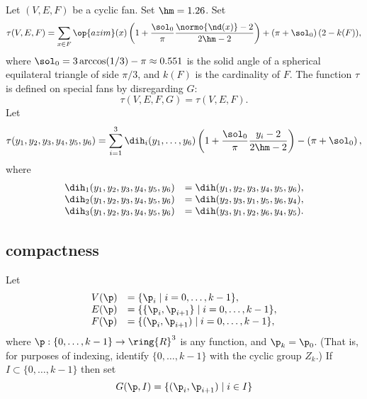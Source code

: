 \begin{definition}\label{def:tau}
Let $(V,E,F)$ be a cyclic fan.  Set $\hm = 1.26$.  Set
\begin{displaymath}
  \tau(V,E,F) =\sum_{x\in F} \op{azim}(x)\left(1 + \dfrac{\sol_0}{\pi}  
    \dfrac{\normo{\nd(x)}-2}{2\hm-2}\right) 
+ \left(\pi+{\sol_0}\right) (2- k(F)),
\end{displaymath}
where $\sol_0=3\arccos(1/3)-\pi\approx0.551$ is the solid angle of a
spherical equilateral triangle of side $\pi/3$, and $k(F)$ is the
cardinality of $F$.  The function $\tau$ is defined on special fans by
disregarding $G$:
\begin{displaymath}
\tau(V,E,F,G) = \tau(V,E,F).
\end{displaymath}
Let 
\begin{displaymath}
  \tau(y_1,y_2,y_3,y_4,y_5,y_6) =
  \sum_{i=1}^3 \dih_i(y_1,\ldots,y_6)
\left(1 + \dfrac{\sol_0}{\pi}  \dfrac{y_i -2}{2\hm-2}\right) 
- \left(\pi+{\sol_0}\right),
\end{displaymath}
where
\begin{displaymath}
\begin{array}{lll}
\dih_1(y_1,y_2,y_3,y_4,y_5,y_6) &= \dih(y_1,y_2,y_3,y_4,y_5,y_6),\\
\dih_2(y_1,y_2,y_3,y_4,y_5,y_6) &= \dih(y_2,y_3,y_1,y_5,y_6,y_4),\\
\dih_3(y_1,y_2,y_3,y_4,y_5,y_6) &= \dih(y_3,y_1,y_2,y_6,y_4,y_5).\\
\end{array}
\end{displaymath}
\end{definition}



\subsection{compactness}

Let 
\begin{displaymath}
\begin{array}{lll}
V(\p) &= \{\p_{i}\mid i=0,\ldots,k-1\},\\
E(\p) &= \{\{\p_{i},\p_{i+1}\}\mid i=0,\ldots,k-1\},\\
F(\p) &= \{(\p_{i},\p_{i+1}) \mid i=0,\ldots,k-1\},\\
\end{array}
\end{displaymath}
where $\p:\{0,\ldots,k-1\}\to \ring{R}^3$ is any function, and $\p_k =
\p_0$.  (That is, for purposes of indexing, identify
$\{0,\ldots,k-1\}$ with the cyclic group $Z_k$.)  If
$I\subset\{0,\ldots,k-1\}$ then set
\begin{displaymath}G(\p,I) = \{(\p_i ,\p_{i+1}) \mid i\in
I\}\end{displaymath}

